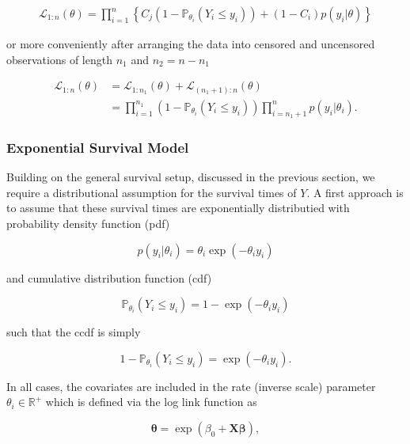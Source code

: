 \documentclass[11pt]{article}
\begin{document}
\begin{align*}
    \mathcal{L}_{1:n}(\theta) = \prod_{i = 1}^n \left\{C_j (1-\mathbb{P}_{\theta_i}(Y_i \leq y_i)) + (1-C_i) p(y_i|\theta)\right\}
\end{align*}

or more conveniently after arranging the data into censored and uncensored observations of length $n_1$ and $n_2 = n - n_1$ 

\begin{align}
    \mathcal{L}_{1:n}(\theta) &= \mathcal{L}_{1:n_1}(\theta) + \mathcal{L}_{(n_1 + 1):n}(\theta) \nonumber \\
    &= \prod_{i = 1}^{n_1} (1-\mathbb{P}_{\theta_i}(Y_i \leq y_i)) \prod_{i = n_1 + 1}^n p(y_i|\theta_i).
    \label{eq:likelihood}
\end{align}

\subsubsection{Exponential Survival Model}
Building on the general survival setup, discussed in the previous section, we require a distributional assumption for the survival times of $Y$. A first approach is to assume that these survival times are exponentially distributied with probability density function (pdf)

\begin{equation*}
    p(y_i|\theta_i) = \theta_i \exp(-\theta_i y_i)
\end{equation*}

and cumulative distribution function (cdf) 

\begin{equation*}
    \mathbb{P}_{\theta_i}(Y_i \leq y_i) = 1 - \exp(-\theta_i y_i)
\end{equation*}

such that the ccdf is simply
    
\begin{equation*}
    1 - \mathbb{P}_{\theta_i}(Y_i \leq y_i) = \exp(-\theta_i y_i).
\end{equation*}
    
In all cases, the covariates are included in the rate (inverse scale) parameter $\theta_i \in \mathbb{R}^+$ which is defined via the log link function as 

\begin{equation*}
    \bm{\theta} = \exp(\beta_0 + \bm{X}\bm{\beta}),
\end{equation*}
\end{document}
